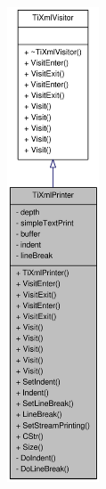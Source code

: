 \begin{figure}[H]
\begin{center}
\leavevmode
\includegraphics[height=400pt]{class_ti_xml_printer__coll__graph}
\end{center}
\end{figure}
